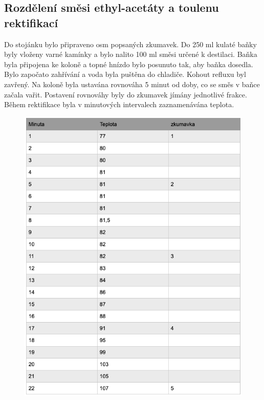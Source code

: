 \documentclass[13pt, a4paper, twoside]{article}
\begin{document}
\subsection*{Rozdělení směsi ethyl-acetáty a toulenu rektifikací}
Do stojánku bylo připraveno osm popsaných zkumavek. Do 250 ml kulaté baňky byly vloženy varné kamínky a bylo nalito 100 ml směsi určené k destilaci. Baňka byla připojena ke koloně a topné hnízdo bylo posunuto tak, aby baňka dosedla. Bylo započato zahřívání a voda byla puštěna do chladiče. Kohout refluxu byl zavřený. Na koloně byla ustavána rovnováha 5 minut od doby, co se směs v baňce začala vařit. Postavení rovnováhy byly do zkumavek jímány jednotlivé frakce. Během rektifikace byla v minutových intervalech zaznamenávána teplota.
\begin{figure}[H]
    \centering
    \includegraphics[width=6.5in]{uloha_8_tab_1.png}
\end{figure}
\newpage
\end{document}
